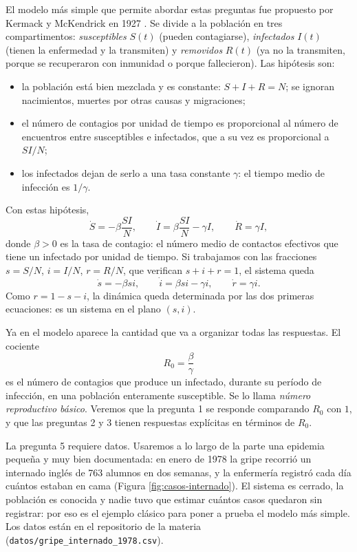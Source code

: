 \documentclass[12pt, a4paper]{amsbook}
\theoremstyle{remark}
\theoremstyle{definition}
\numberwithin{section}{chapter}
\numberwithin{subsection}{section}
\numberwithin{equation}{section}
\numberwithin{figure}{chapter}
\begin{document}
El modelo más simple que permite abordar estas preguntas fue propuesto por Kermack y McKendrick en 1927 \cite{Kermack}. Se divide a la población en tres compartimentos: \emph{susceptibles} $S(t)$ (pueden contagiarse), \emph{infectados} $I(t)$ (tienen la enfermedad y la transmiten) y \emph{removidos} $R(t)$ (ya no la transmiten, porque se recuperaron con inmunidad o porque fallecieron). Las hipótesis son:
\begin{itemize}
\item la población está bien mezclada y es constante: $S+I+R=N$; se ignoran nacimientos, muertes por otras causas y migraciones;
\item el número de contagios por unidad de tiempo es proporcional al número de encuentros entre susceptibles e infectados, que a su vez es proporcional a $SI/N$;
\item los infectados dejan de serlo a una tasa constante $\gamma$: el tiempo medio de infección es $1/\gamma$.
\end{itemize}
Con estas hipótesis,
\begin{equation}\label{eq:SIR-conductor}
\dot S = -\beta \frac{SI}{N},\qquad \dot I = \beta\frac{SI}{N} - \gamma I,\qquad \dot R = \gamma I,
\end{equation}
donde $\beta>0$ es la tasa de contagio: el número medio de contactos efectivos que tiene un infectado por unidad de tiempo. Si trabajamos con las fracciones $s=S/N$, $i=I/N$, $r=R/N$, que verifican $s+i+r=1$, el sistema queda
\begin{equation}\label{eq:SIR-frac}
\dot s = -\beta s i,\qquad \dot i = \beta s i - \gamma i,\qquad \dot r = \gamma i .
\end{equation}
Como $r=1-s-i$, la dinámica queda determinada por las dos primeras ecuaciones: es un sistema en el plano $(s,i)$.

Ya en el modelo aparece la cantidad que va a organizar todas las respuestas. El cociente
$$
R_0 = \frac{\beta}{\gamma}
$$
es el número de contagios que produce un infectado, durante su período de infección, en una población enteramente susceptible. Se lo llama \emph{número reproductivo básico}. Veremos que la pregunta 1 se responde comparando $R_0$ con $1$, y que las preguntas 2 y 3 tienen respuestas explícitas en términos de $R_0$.

La pregunta 5 requiere datos. Usaremos a lo largo de la parte una epidemia pequeña y muy bien documentada: en enero de 1978 la gripe recorrió un internado inglés de 763 alumnos en dos semanas, y la enfermería registró cada día cuántos estaban en cama \cite{BMJ1978} (Figura \ref{fig:casos-internado}). El sistema es cerrado, la población es conocida y nadie tuvo que estimar cuántos casos quedaron sin registrar: por eso es el ejemplo clásico para poner a prueba el modelo más simple. Los datos están en el repositorio de la materia (\nolinkurl{datos/gripe_internado_1978.csv}).
\end{document}
